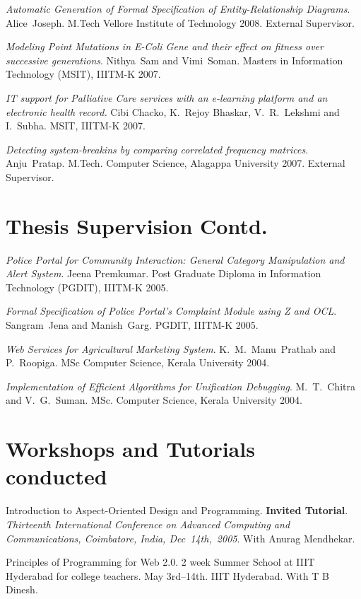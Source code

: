 \documentclass[11pt,margin,line]{res}
\begin{document}
\begin{resume}
{\em Automatic Generation of Formal Specification of
  Entity-Relationship Diagrams}.  Alice~Joseph.  M.Tech
Vellore Institute of Technology 2008.  External Supervisor.

{\em Modeling Point Mutations in E-Coli Gene and their
  effect on fitness over successive generations}.
Nithya~Sam and Vimi~Soman.  Masters in Information
Technology (MSIT), IIITM-K 2007.  

{\em IT support for Palliative Care services with an
  e-learning platform and an electronic health record.}
Cibi Chacko, K.~Rejoy Bhaskar, V.~R.~Lekshmi and I.~Subha.
MSIT, IIITM-K 2007.

{\em Detecting system-breakins by comparing correlated
  frequency matrices}.  Anju~Pratap.  M.Tech. Computer
Science, Alagappa University 2007.  External Supervisor.

\section{\sc Thesis Supervision Contd.}


{\em Police Portal for Community Interaction: General
  Category Manipulation and Alert System}.  Jeena Premkumar.
Post Graduate Diploma in Information Technology (PGDIT),
IIITM-K 2005.

{\em Formal Specification of Police Portal's Complaint
  Module using Z and OCL}.  Sangram~Jena and Manish~Garg.
PGDIT, IIITM-K 2005. 

{\emph{Web Services for Agricultural Marketing System}}.
K.~M.~Manu~Prathab and P.~Roopiga.  MSc Computer Science,
Kerala University 2004.

{\em Implementation of Efficient Algorithms for Unification
  Debugging}.  M.~T.~Chitra and V.~G.~Suman.  MSc. Computer
Science, Kerala University 2004.


\section{Workshops and Tutorials conducted}

Introduction to Aspect-Oriented Design and Programming.
{\bf Invited Tutorial}.  {\em Thirteenth International
  Conference on Advanced Computing and Communications,
  Coimbatore, India, Dec~14th,~2005}.  With Anurag
Mendhekar.

Principles of Programming for Web 2.0.  2 week Summer School
at IIIT Hyderabad for college teachers.  May 3rd--14th.
IIIT Hyderabad.  With T B Dinesh.



\end{resume}
\end{document}
